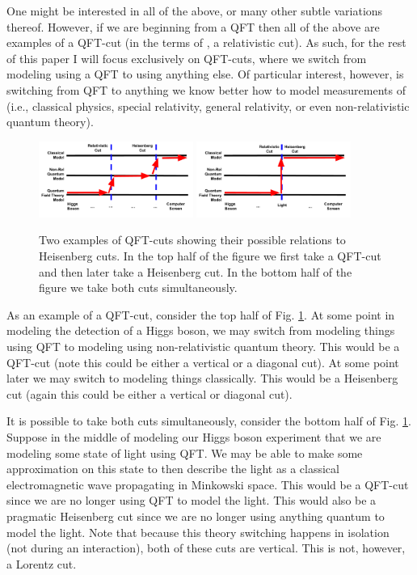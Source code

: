 \documentclass[prd,twocolumn,superscriptaddress,floatfix,amsmath,amssymb,amsfonts,nofootinbib]{revtex4-2}
\begin{document}
One might be interested in all of the above, or many other subtle variations thereof. However, if we are beginning from a QFT then all of the above are examples of a QFT-cut (in the terms of \cite{TaleOfTwo}, a relativistic cut). As such, for the rest of this paper I will focus exclusively on QFT-cuts, where we switch from modeling using a QFT to using anything else. Of particular interest, however, is switching from QFT to anything we know better how to model measurements of (i.e., classical physics, special relativity, general relativity, or even non-relativistic quantum theory).

\begin{figure}
\includegraphics[width=0.45\textwidth]{Figures/RelativisticCut.pdf}
\includegraphics[width=0.45\textwidth]{Figures/RelativisticCut2.pdf}
\caption{Two examples of QFT-cuts showing their possible relations to Heisenberg cuts. In the top half of the figure we first take a QFT-cut and then later take a Heisenberg cut. In the bottom half of the figure we take both cuts simultaneously.}\label{FigHiggs}
\end{figure}

As an example of a QFT-cut, consider the top half of Fig. \ref{FigHiggs}. At some point in modeling the detection of a Higgs boson, we may switch from modeling things using QFT to modeling using non-relativistic quantum theory. This would be a QFT-cut (note this could be either a vertical or a diagonal cut). At some point later we may switch to modeling things classically. This would be a Heisenberg cut (again this could be either a vertical or diagonal cut).

It is possible to take both cuts simultaneously, consider the bottom half of Fig. \ref{FigHiggs}. Suppose in the middle of modeling our Higgs boson experiment that we are modeling some state of light using QFT. We may be able to make some approximation on this state to then describe the light as a classical electromagnetic wave propagating in Minkowski space. This would be a QFT-cut since we are no longer using QFT to model the light. This would also be a pragmatic Heisenberg cut since we are no longer using anything quantum to model the light. Note that because this theory switching happens in isolation (not during an interaction), both of these cuts are vertical. This is not, however, a Lorentz cut.
\end{document}
